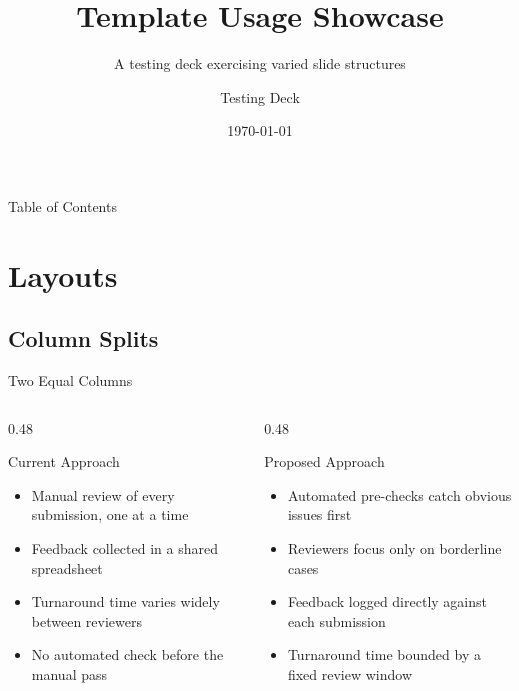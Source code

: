 \documentclass[aspectratio=169]{beamer}
\title{Template Usage Showcase}
\subtitle{A testing deck exercising varied slide structures}
\author{Testing Deck}
\institute{Not for publication}
\date{\today}
\begin{document}
\begin{frame}
  \titlepage
\end{frame}

\begin{frame}{Table of Contents}
  \tableofcontents
\end{frame}

\section{Layouts}

\subsection{Column Splits}

\begin{frame}{Two Equal Columns}
  \begin{columns}[T]
    \begin{column}{0.48\textwidth}
      \begin{block}{Current Approach}
        \begin{itemize}
          \item Manual review of every submission, one at a time
          \item Feedback collected in a shared spreadsheet
          \item Turnaround time varies widely between reviewers
          \item No automated check before the manual pass
        \end{itemize}
      \end{block}
    \end{column}
    \begin{column}{0.48\textwidth}
      \begin{block}{Proposed Approach}
        \begin{itemize}
          \item Automated pre-checks catch obvious issues first
          \item Reviewers focus only on borderline cases
          \item Feedback logged directly against each submission
          \item Turnaround time bounded by a fixed review window
        \end{itemize}
      \end{block}
    \end{column}
  \end{columns}
\end{frame}
\end{document}
